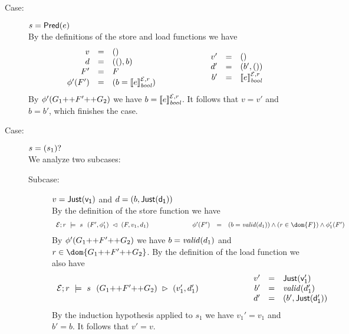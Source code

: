 {\begin{description}
\item[Case:] $s = \SPred{e}$\\[1ex]
%
By the definitions of the store and load functions we have
\[
\begin{array}{rcl}
v &=& ()\\
d &=& ((),b)\\
F' &=& F\\
\phi'(F') &=& (b = \eval{e}{\Env,r}{\mathit{bool}})\\
\end{array}\hspace*{2cm}\begin{array}{rcl}
v' &=& ()\\
d' &=& (b',())\\
b' &=& \eval{e}{\Env,r}{\mathit{bool}}\\
\end{array}
\]
By $\phi'(G_1 \FAppend F' \FAppend G_2)$ we have $b =
\eval{e}{\Env,r}{\mathit{bool}}$. It follows that $v = v'$ and $b =
b'$, which finishes the case.

\item[Case:] $s = \SOption{s_1}$\\[1ex]
%
We analyze two subcases:
\begin{description}
\item[Subcase:] $v = \Just{v_1}$ and $d = (b,\Just{d_1})$\\[1ex]
%
By the definition of the store function we have
\[
\begin{array}{l}
\store{\Env}{F}{r}{ v_1,d_1 }{s}{F',\phi_1'}\\
\end{array}\hspace*{2cm}\begin{array}{rcl}
\phi'(F') &=& (b = \valid{d_1}) \wedge (r \in \dom{F}) \wedge \phi_1'(F')\\
\end{array}
\]
%
By $\phi'(G_1 \FAppend F' \FAppend G_2)$ we have $b = \valid{d_1}$ and
$r \in \dom{G_1 \FAppend F' \FAppend G_2}$.  By the definition of the
load function we also have
\[ 
\begin{array}{rcll}
\load{\Env}{(G_1 \FAppend F' \FAppend G_2)}{r}{s}{v_1',d_1'}\\
\end{array}\hspace*{2cm}\begin{array}{rcl}
v' &=& \Just{v_1'}\\
b' &=& \valid{d_1'}\\
d' &=& (b',\Just{d_1'})\\
\end{array}
\]
By the induction hypothesis applied to $s_1$ we have $v_1' = v_1$ and
$b' = b$. It follows that $v' = v$.


\end{description}
\end{description}}

